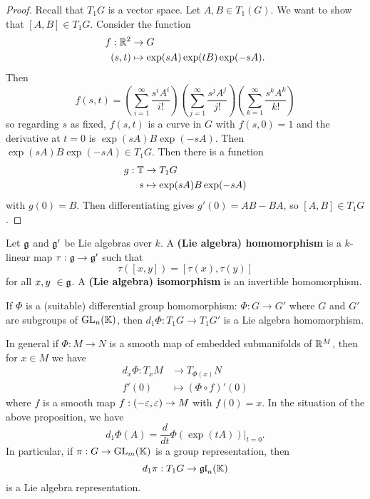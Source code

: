 \begin{proof}
  Recall that $T_1G$ is a vector space.
  Let $A,B \in T_1(G)$.
  We want to show that $[A,B] \in T_1G$.
  Consider the function
  \begin{align*}
    f: \mathbb{R}^2 &\to G \\
    (s,t) &\mapsto \exp(sA)\exp(tB)\exp(-sA).
  \end{align*}
  Then
  \[ f(s,t) = \left( \sum_{i=1}^\infty \frac{s^iA^i}{i!} \right) \left( \sum_{j=1}^\infty \frac{s^jA^j}{j!} \right) \left( \sum_{k=1}^\infty \frac{s^kA^k}{k!} \right) \]
  so regarding $s$ as fixed, $f(s,t)$ is a curve in $G$ with $f(s,0)=1$ and the derivative at $t=0$ is $\exp(sA)B\exp(-sA)$.
  Then $\exp(sA)B\exp(-sA) \in T_1G$.
  Then there is a function
  \begin{align*}
    g: \mathbb{T} &\to T_1G \\
    s &\mapsto \exp(sA)B\exp(-sA)
  \end{align*}
  with $g(0)=B$.
  Then differentiating gives $g'(0)=AB-BA$, so $[A,B] \in T_1G$.
\end{proof}

\begin{defn}
  Let $\mathfrak{g}$ and $\mathfrak{g}'$ be Lie algebras over $k$.
  A \textbf{(Lie algebra) homomorphism} is a $k$-linear map $\tau: \mathfrak{g} \to \mathfrak{g}'$ such that
  \[ \tau([x,y])=[\tau(x),\tau(y)] \]
  for all $x,y\ \in \mathfrak{g}$.
  A \textbf{(Lie algebra) isomorphism} is an invertible homomorphism.
\end{defn}

\begin{prop}
  If $\Phi$ is a (suitable) differential group homomorphism: $\Phi: G \to G'$ where $G$ and $G'$ are subgroups of $\operatorname{GL}_n(\mathbb{K})$, then $d_1\Phi: T_1G \to T_1G'$ is a Lie algebra homomorphism.
\end{prop}

\begin{rmk}
  In general if $\Phi: M \to N$ is a smooth map of embedded submanifolds of $\mathbb{R}^M$, then for $x \in M$ we have
  \begin{align*}
    d_x\Phi: T_xM &\to T_{\Phi(x)}N \\
    f'(0) &\mapsto (\Phi\circ f)'(0)
  \end{align*}
  where $f$ is a smooth map $f:(-\varepsilon,\varepsilon) \to M$ with $f(0)=x$.
  In the situation of the above proposition, we have
  \[ d_1 \Phi(A) = \frac{d}{dt} \Phi(\exp(tA))\Big\vert_{t=0}. \]
  In particular, if $\pi: G \to \operatorname{GL}_m(\mathbb{K})$ is a group representation, then
  \[ d_1\pi: T_1G \to \operatorname{\mathfrak{gl}}_n(\mathbb{K}) \]
  is a Lie algebra representation.
\end{rmk}

